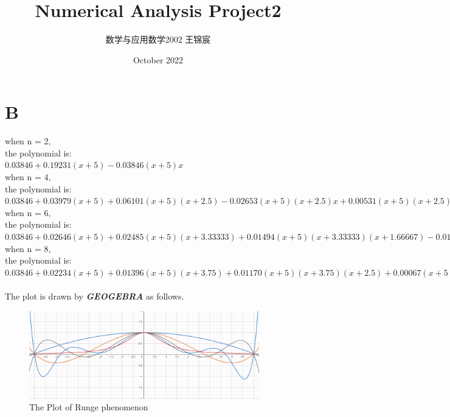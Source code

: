\documentclass[UTF8]{ctexart}
\title{Numerical Analysis Project2}
\author{数学与应用数学2002 王锦宸 }
\date{October 2022}
\begin{document}
\maketitle

\section*{B}
\noindent when n = 2,\\
the polynomial is:\\$0.03846+0.19231(x+5)-0.03846(x+5)x$\\
when n = 4,\\
the polynomial is:\\$0.03846+0.03979(x+5)+0.06101(x+5)(x+2.5)-0.02653(x+5)(x+2.5)x+0.00531(x+5)(x+2.5)x(x-2.5)$\\
when n = 6,\\
the polynomial is:\\$0.03846+0.02646(x+5)+0.02485(x+5)(x+3.33333)+0.01494(x+5)(x+3.33333)(x+1.66667)-0.01317(x+5)(x+3.33333)(x+1.66667)x+0.00420(x+5)(x+3.33333)(x+1.66667)x(x-1.66667)-0.00084(x+5)(x+3.33333)(x+1.66667)x(x-1.66667)(x-3.33333)$\\
when n = 8,\\
the polynomial is:\\$0.03846+0.02234(x+5)+0.01396(x+5)(x+3.75)+0.01170(x+5)(x+3.75)(x+2.5)+0.00067(x+5)(x+3.75)(x+2.5)(x+1.25)-0.00490(x+5)(x+3.75)(x+2.5)(x+1.25)x+0.00244(x+5)(x+3.75)(x+2.5)(x+1.25)x(x-1.25)-0.00069(x+5)(x+3.75)(x+2.5)(x+1.25)x(x-1.25)(x-2.5)+0.00014(x+5)(x+3.75)(x+2.5)(x+1.25)x(x-1.25)(x-2.5)(x-3.75)$\\
\\
The plot is drawn by \textbf{\textit{GEOGEBRA}} as follows.
\graphicspath{{Images/}}
\begin{figure}[htp]
    \centering
    \includegraphics[width=10cm]{PlotB}
    \caption{The Plot of Runge phenomenon}
    \label{fig:PlotB}
\end{figure}
\end{document}
